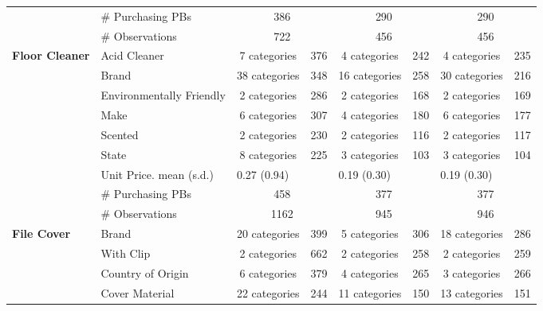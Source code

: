 \begin{longtable}{llccccccccc}
 & \# Purchasing PBs & \multicolumn{3}{c}{386} & \multicolumn{3}{c}{290} & \multicolumn{3}{c}{290} \\* 
 & \# Observations & \multicolumn{3}{c}{722} & \multicolumn{3}{c}{456} & \multicolumn{3}{c}{456} \\* 
 \midrule 
 \multirow{9}{*}{\textbf{Floor Cleaner}} & Acid Cleaner & \multicolumn{2}{c}{7 categories} & 376 & \multicolumn{2}{c}{4 categories} & 242 & \multicolumn{2}{c}{4 categories} & 235 \\* 
 & Brand & \multicolumn{2}{c}{38 categories} & 348 & \multicolumn{2}{c}{16 categories} & 258 & \multicolumn{2}{c}{30 categories} & 216 \\* 
 & Environmentally Friendly & \multicolumn{2}{c}{2 categories} & 286 & \multicolumn{2}{c}{2 categories} & 168 & \multicolumn{2}{c}{2 categories} & 169 \\* 
 & Make & \multicolumn{2}{c}{6 categories} & 307 & \multicolumn{2}{c}{4 categories} & 180 & \multicolumn{2}{c}{6 categories} & 177 \\ 
 & Scented & \multicolumn{2}{c}{2 categories} & 230 & \multicolumn{2}{c}{2 categories} & 116 & \multicolumn{2}{c}{2 categories} & 117 \\* 
 & State & \multicolumn{2}{c}{8 categories} & 225 & \multicolumn{2}{c}{3 categories} & 103 & \multicolumn{2}{c}{3 categories} & 104 \\* 
 \cmidrule{2-11} 
 & Unit Price. mean (s.d.) & \multicolumn{3}{l}{0.27 (0.94)} & \multicolumn{3}{l}{0.19 (0.30)} & \multicolumn{3}{l}{0.19 (0.30)} \\* 
 & \# Purchasing PBs & \multicolumn{3}{c}{458} & \multicolumn{3}{c}{377} & \multicolumn{3}{c}{377} \\* 
 & \# Observations & \multicolumn{3}{c}{1162} & \multicolumn{3}{c}{945} & \multicolumn{3}{c}{946} \\* 
 \midrule 
 \multirow{10}{*}{\textbf{File Cover}} & Brand & \multicolumn{2}{c}{20 categories} & 399 & \multicolumn{2}{c}{5 categories} & 306 & \multicolumn{2}{c}{18 categories} & 286 \\* 
 & With Clip & \multicolumn{2}{c}{2 categories} & 662 & \multicolumn{2}{c}{2 categories} & 258 & \multicolumn{2}{c}{2 categories} & 259 \\* 
 & Country of Origin & \multicolumn{2}{c}{6 categories} & 379 & \multicolumn{2}{c}{4 categories} & 265 & \multicolumn{2}{c}{3 categories} & 266 \\* 
 & Cover Material & \multicolumn{2}{c}{22 categories} & 244 & \multicolumn{2}{c}{11 categories} & 150 & \multicolumn{2}{c}{13 categories} & 151 \\* 

\end{longtable}
